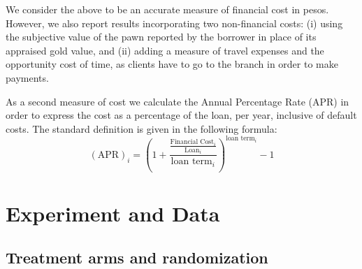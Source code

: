 \documentclass[12pt, a4paper]{article}
\begin{document}
We consider the above to be an accurate measure of financial cost in pesos. However, we also report results incorporating two non-financial costs: (i) using the subjective value of the pawn reported by the borrower in place of its appraised gold value, and (ii) adding a measure of travel expenses and the opportunity cost of time, as clients have to go to the branch in order to make payments.

As a second measure of cost we calculate the Annual Percentage Rate (APR) in order to express the cost as a percentage of the loan, per year, inclusive of default costs. The standard definition is given in the following formula: 
$$(\text{APR})_i =\left( 1 + \frac{\frac{\text{Financial Cost}_i}{\text{Loan}_i}}{\text{loan term}_i}\right)^{\text{loan term}_i}-1 $$





\vspace{.2in}
\section{Experiment and Data} \label{Design}

\subsection{Treatment arms and randomization}

\end{document}
